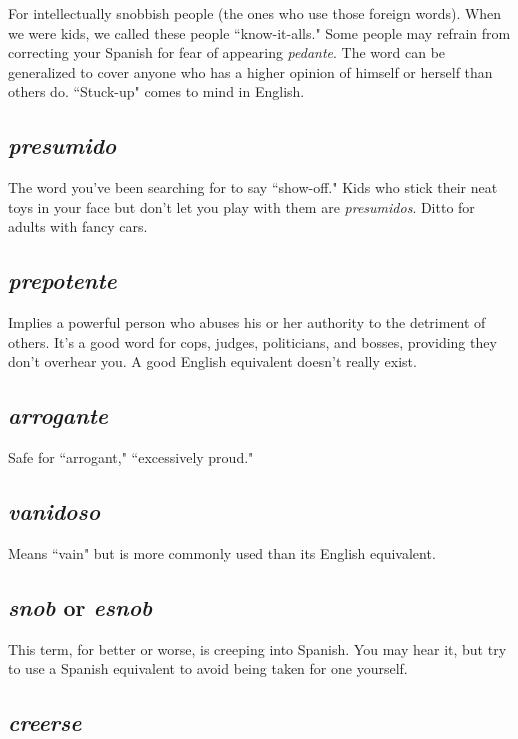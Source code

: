 For intellectually snobbish people (the ones who
use those foreign words). When we were kids, we called these people
``know-it-alls." Some people may refrain from correcting your Spanish
for fear of appearing \emph{pedante}. The word can be generalized to cover
anyone who has a higher opinion of himself or herself than others do.
``Stuck-up" comes to mind in English.

\subsection{\emph{presumido}}

The word you've been searching for to say
``show-off." Kids who stick their neat toys in your face but don't let
you play with them are \emph{presumidos}. Ditto for adults with fancy cars.

\subsection{\emph{prepotente}}

Implies a powerful person who abuses his or
her authority to the detriment of others. It's a good word for cops,
judges, politicians, and bosses, providing they don't overhear you. A
good English equivalent doesn't really exist.

\subsection{\emph{arrogante}}

Safe for ``arrogant," ``excessively proud."

\subsection{\emph{vanidoso}}

Means ``vain" but is more commonly used than
its English equivalent.

\subsection{\emph{snob} or \emph{esnob}}

This term, for better or worse, is creeping
into Spanish. You may hear it, but try to use a Spanish equivalent to
avoid being taken for one yourself.

\subsection{\emph{creerse}}

